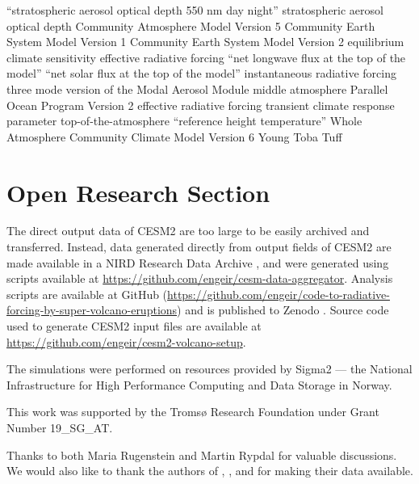 \documentclass[draft]{agujournal2019}
\begin{document}
\begin{acronyms}
   ``stratospheric aerosol optical depth 550 nm day night'' 
  stratospheric aerosol optical depth  Community Atmosphere Model Version 5
   Community Earth System Model Version 1  Community Earth
  System Model Version 2  equilibrium climate sensitivity  effective
  radiative forcing  ``net longwave flux at the top of the model''
   ``net solar flux at the top of the model''  instantaneous
  radiative forcing  three mode version of the Modal Aerosol Module 
  middle atmosphere  Parallel Ocean Program Version 2  effective
  radiative forcing  transient climate response parameter 
  top-of-the-atmosphere  ``reference height temperature'' 
  Whole Atmosphere Community Climate Model Version 6  Young Toba Tuff
\end{acronyms}

\section*{Open Research Section}


The direct output data of CESM2 are too large to be easily archived and transferred.
Instead, data generated directly from output fields of CESM2 are made available in a
NIRD Research Data Archive \cite{enger2024}, and were generated using scripts available
at \url{https://github.com/engeir/cesm-data-aggregator}. Analysis scripts are available
at GitHub
(\url{https://github.com/engeir/code-to-radiative-forcing-by-super-volcano-eruptions})
and is published to Zenodo \cite{enger2024analysis}. Source code used to generate CESM2
input files are available at \url{https://github.com/engeir/cesm2-volcano-setup}.

\acknowledgments

The simulations were performed on resources provided by Sigma2 --- the National
Infrastructure for High Performance Computing and Data Storage in Norway.

This work was supported by the Tromsø Research Foundation under Grant Number 19\_SG\_AT.

Thanks to both Maria Rugenstein and Martin Rypdal for valuable discussions. We would
also like to thank the authors of , , and
 for making their data available.


\end{document}
